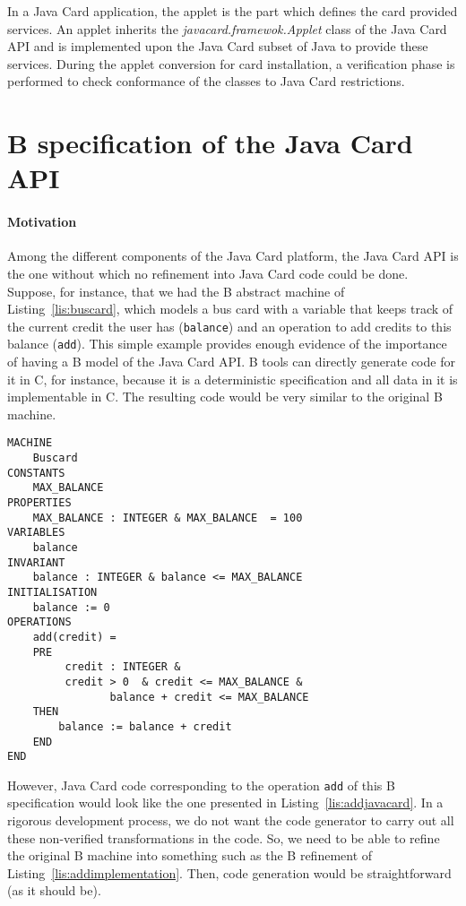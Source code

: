 \documentclass{entcs}
\begin{document}
In a Java Card application, the applet is the part which defines the card provided services. 
An applet inherits the \emph{javacard.framewok.Applet} class of the Java Card API and is
implemented upon the Java Card subset of Java to provide these services.  During the applet
conversion for card installation, a verification phase is performed to
check conformance of the classes to Java Card restrictions.

\section{B specification of the Java Card API}\label{sec:api-spec}

\paragraph{Motivation}
Among the different components of the Java Card platform, the Java
Card API is the one without which no refinement into Java Card code
could be done.  Suppose, for instance, that we had the B abstract
machine of Listing~\ref{lis:buscard}, which models a bus card with a
variable that keeps track of the current credit the user has
(\texttt{balance}) and an operation to add credits to this balance
(\texttt{add}). This simple example provides enough evidence of the
importance of having a B model of the Java Card API.  B tools can directly 
generate code for it in C, for instance, because it  is a deterministic specification and all data in
it is implementable in C.  The
resulting code would be very similar to the original B machine.

\begin{lstlisting}
MACHINE
	Buscard
CONSTANTS
	MAX_BALANCE
PROPERTIES
	MAX_BALANCE : INTEGER & MAX_BALANCE  = 100
VARIABLES
	balance
INVARIANT
	balance : INTEGER & balance <= MAX_BALANCE 
INITIALISATION
	balance := 0
OPERATIONS
	add(credit) =
	PRE
		 credit : INTEGER & 
		 credit > 0  & credit <= MAX_BALANCE &
                balance + credit <= MAX_BALANCE 
	THEN
		balance := balance + credit
	END
END
\end{lstlisting}

However, Java Card code corresponding to the operation \texttt{add} of
this B specification would look like the one presented in
Listing~\ref{lis:addjavacard}. In a rigorous development process, we do
not want the code generator to carry out all these non-verified
transformations in the code. So, we need to be able to refine the
original B machine into something such as the B refinement of
Listing~\ref{lis:addimplementation}. Then, code generation would be
straightforward (as it should be).
\end{document}
